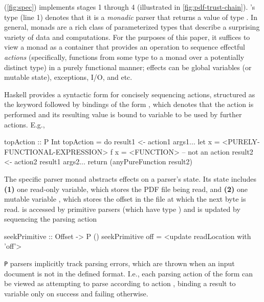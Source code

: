  (\cref{fig:spec}) implements stages 1 through 4 (illustrated in \cref{fig:pdf-trust-chain}).
% 
's type (line 1) denotes that it
is a \emph{monadic} parser  that returns a value of type
.
%
In general, monads are a rich class of parameterized types that
describe a surprising variety of data and computations.
%
For the purposes of this paper, it suffices to view a monad as a container that provides an operation to sequence effectful \emph{actions} (specifically, functions from some type to a monad over a potentially distinct type) in a purely functional manner;
%
effects can be global variables (or mutable state), exceptions, I/O, and etc.

Haskell provides a syntactic form for concisely sequencing actions, structured as the keyword  followed by bindings of the form , which denotes that the action  is performed and its resulting value is bound to variable  to be used by further actions.
%
E.g.,
\begin{codeNoExecute}
  topAction :: P Int
  topAction = do
              result1 <- action1 args1...
              let x = <PURELY-FUNCTIONAL-EXPRESSION>
                  f x = <FUNCTION> -- not an action
              result2 <- action2 result1 args2...
              return (anyPureFunction result2)
\end{codeNoExecute}
%

The specific parser monad  abstracts effects on a parser's state.
%
Its state includes %
\textbf{(1)} one read-only variable, which stores the PDF file being read, and %
\textbf{(2)} one mutable variable \rdloc{}, which stores the offset in the file at which the next byte is read.
%
\rdloc{} is accessed by primitive parsers (which have type )
and is updated by sequencing the parsing action
\begin{codeNoExecute}
  seekPrimitive :: Offset -> P ()
  seekPrimitive off = <update readLocation with 'off'>
\end{codeNoExecute}
%
%
\texttt{P} parsers implicitly track parsing errors, which are thrown when an input document is not in the defined format.
%
I.e., each parsing action of the form  can be viewed as attempting to parse according to action , binding a result to variable  only on success and failing otherwise.


